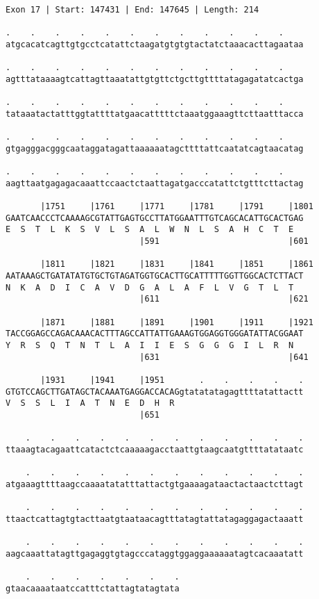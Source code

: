 \documentclass{article}
\begin{document}
\begin{Verbatim}
Exon 17 | Start: 147431 | End: 147645 | Length: 214
 
.    .    .    .    .    .    .    .    .    .    .    .    
atgcacatcagttgtgcctcatattctaagatgtgtgtactatctaaacacttagaataa
  
.    .    .    .    .    .    .    .    .    .    .    .    
agtttataaaagtcattagttaaatattgtgttctgcttgttttatagagatatcactga
  
.    .    .    .    .    .    .    .    .    .    .    .    
tataaatactatttggtattttatgaacatttttctaaatggaaagttcttaatttacca
  
.    .    .    .    .    .    .    .    .    .    .    .    
gtgagggacgggcaataggatagattaaaaaatagcttttattcaatatcagtaacatag
  
.    .    .    .    .    .    .    .    .    .    .    .    
aagttaatgagagacaaattccaactctaattagatgacccatattctgtttcttactag
  
       |1751     |1761     |1771     |1781     |1791     |1801
GAATCAACCCTCAAAAGCGTATTGAGTGCCTTATGGAATTTGTCAGCACATTGCACTGAG
E  S  T  L  K  S  V  L  S  A  L  W  N  L  S  A  H  C  T  E  
                           |591                          |601
  
       |1811     |1821     |1831     |1841     |1851     |1861
AATAAAGCTGATATATGTGCTGTAGATGGTGCACTTGCATTTTTGGTTGGCACTCTTACT
N  K  A  D  I  C  A  V  D  G  A  L  A  F  L  V  G  T  L  T  
                           |611                          |621
  
       |1871     |1881     |1891     |1901     |1911     |1921
TACCGGAGCCAGACAAACACTTTAGCCATTATTGAAAGTGGAGGTGGGATATTACGGAAT
Y  R  S  Q  T  N  T  L  A  I  I  E  S  G  G  G  I  L  R  N  
                           |631                          |641
  
       |1931     |1941     |1951       .    .    .    .    .
GTGTCCAGCTTGATAGCTACAAATGAGGACCACAGgtatatatagagttttatattactt
V  S  S  L  I  A  T  N  E  D  H  R                          
                           |651                             
  
    .    .    .    .    .    .    .    .    .    .    .    .
ttaaagtacagaattcatactctcaaaaagacctaattgtaagcaatgttttatataatc
  
    .    .    .    .    .    .    .    .    .    .    .    .
atgaaagttttaagccaaaatatatttattactgtgaaaagataactactaactcttagt
  
    .    .    .    .    .    .    .    .    .    .    .    .
ttaactcattagtgtacttaatgtaataacagtttatagtattatagaggagactaaatt
  
    .    .    .    .    .    .    .    .    .    .    .    .
aagcaaattatagttgagaggtgtagcccataggtggaggaaaaaatagtcacaaatatt
  
    .    .    .    .    .    .    .
gtaacaaaataatccatttctattagtatagtata
\end{Verbatim}
\end{document}
